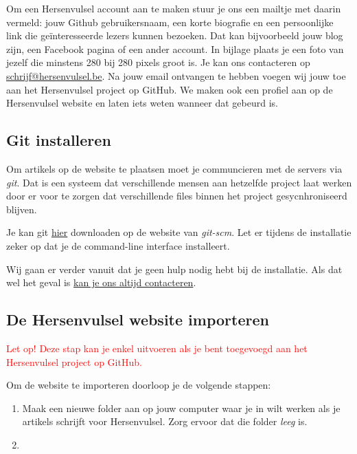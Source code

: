 \documentclass[12pt]{article}
\begin{document}
Om een Hersenvulsel account aan te maken stuur je ons een mailtje met daarin vermeld: jouw Github gebruikersnaam, een korte biografie en een persoonlijke link die geïnteresseerde lezers kunnen bezoeken. Dat kan bijvoorbeeld jouw blog zijn, een Facebook pagina of een ander account. In bijlage plaats je een foto van jezelf die minstens 280 bij 280 pixels groot is. Je kan ons contacteren op \href{mailto:schrijf@hersenvulsel.be}{schrijf@hersenvulsel.be}. Na jouw email ontvangen te hebben voegen wij jouw toe aan het Hersenvulsel project op GitHub. We maken ook een profiel aan op de Hersenvulsel website en laten iets weten wanneer dat gebeurd is.


\subsection{Git installeren}
Om artikels op de website te plaatsen moet je communcieren met de servers via \emph{git}. Dat is een systeem dat verschillende mensen aan hetzelfde project laat werken door er voor te zorgen dat verschillende files binnen het project gesycnhroniseerd blijven. 

Je kan git \href{https://git-scm.com/downloads}{hier} downloaden op de website van \emph{git-scm}. Let er tijdens de installatie zeker op dat je de command-line interface installeert. 

Wij gaan er verder vanuit dat je geen hulp nodig hebt bij de installatie. Als dat wel het geval is \href{https://hersenvulsel.be/contact/}{kan je ons altijd contacteren}.


\subsection{De Hersenvulsel website importeren}
\textcolor{red}{Let op! Deze stap kan je enkel uitvoeren als je bent toegevoegd aan het Hersenvulsel project op GitHub.}
\vspace{7 mm}

Om de website te importeren doorloop je de volgende stappen:

\begin{enumerate}
 \item{Maak een nieuwe folder aan op jouw computer waar je in wilt werken als je artikels schrijft voor Hersenvulsel. Zorg ervoor dat die folder \emph{leeg} is.}
 \item{}
\end{enumerate}
\end{document}
